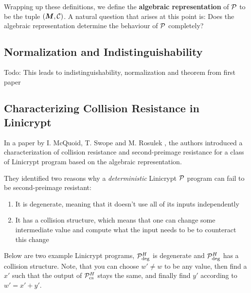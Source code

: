 Wrapping up these definitions,
we define the \textbf{algebraic representation} of $\P$ to be the tuple $(\M, \C)$.
A natural question that arises at this point is:
Does the algebraic representation determine the behaviour of $\P$ completely?

\subsection{Normalization and Indistinguishability}

Todo: This leads to indistinguishability, normalization and theorem from first paper

\subsection{Characterizing Collision Resistance in Linicrypt}

In a paper by I. McQuoid, T. Swope and M. Rosulek
\cite[Characterizing Collision and Second-Preimage Resistance in Linicrypt]{RMS20},
the authors introduced a characterization of collision resistance
and second-preimage resistance for a class of Linicrypt program based on the algebraic representation.

They identified two reasons why a \textit{deterministic} Linicrypt $\P$ program can fail to be second-preimage resistant:
\begin{enumerate}
  \item It is degenerate, meaning that it doesn't use all of its inputs independently
  \item It has a collision structure,
    which means that one can change some intermediate value and compute what the input needs to be to counteract this change
\end{enumerate}

Below are two example Linicrypt programs, $\P^\H_\textrm{deg}$ is degenerate and $\P^\H_\textrm{deg}$ has a collision structure.
Note, that you can choose $w' \neq w$ to be any value,
then find a $x'$ such that the output of $\P^\H_{\textrm{cs}}$ stays the same,
and finally find $y'$ according to $w' = x' + y'$.

\begin{pchstack}[center,space=2cm]
\end{pchstack}

